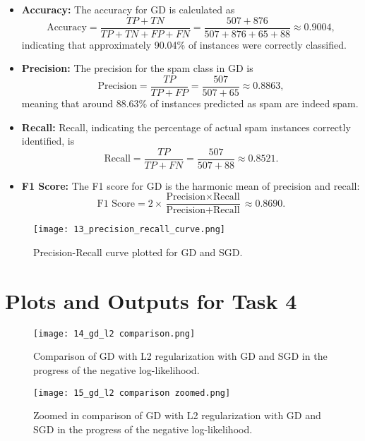 \documentclass[a4paper,oneside,bibliography=totoc]{scrartcl}
\begin{document}
\begin{itemize}
    \item \textbf{Accuracy:} The accuracy for GD is calculated as
    \[
    \text{Accuracy} = \frac{TP + TN}{TP + TN + FP + FN} = \frac{507 + 876}{507 + 876 + 65 + 88} \approx 0.9004,
    \]
    indicating that approximately 90.04\% of instances were correctly classified.

    \item \textbf{Precision:} The precision for the spam class in GD is
    \[
    \text{Precision} = \frac{TP}{TP + FP} = \frac{507}{507 + 65} \approx 0.8863,
    \]
    meaning that around 88.63\% of instances predicted as spam are indeed spam.

    \item \textbf{Recall:} Recall, indicating the percentage of actual spam instances correctly identified, is
    \[
    \text{Recall} = \frac{TP}{TP + FN} = \frac{507}{507 + 88} \approx 0.8521.
    \]

    \item \textbf{F1 Score:} The F1 score for GD is the harmonic mean of precision and recall:
    \[
    \text{F1 Score} = 2 \times \frac{\text{Precision} \times \text{Recall}}{\text{Precision} + \text{Recall}} \approx 0.8690.
    \]
\end{itemize}


\begin{figure}[H]
    \centering
    \texttt{[image: 13\_precision\_recall\_curve.png]}
    \caption{Precision-Recall curve plotted for GD and SGD.}
    \label{fig:13}
\end{figure}

\section{Plots and Outputs for Task 4}
\label{section4}

\begin{figure}[H]
    \centering
    \texttt{[image: 14\_gd\_l2 comparison.png]}
    \caption{Comparison of GD with L2 regularization with GD and SGD in the progress of the negative log-likelihood.}
    \label{fig:14}
\end{figure}

\begin{figure}[H]
    \centering
    \texttt{[image: 15\_gd\_l2 comparison zoomed.png]}
    \caption{Zoomed in comparison of GD with L2 regularization with GD and SGD in the progress of the negative log-likelihood.}
    \label{fig:15}
\end{figure}
\end{document}
